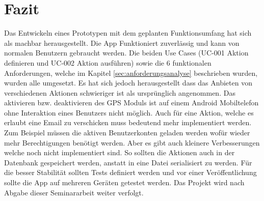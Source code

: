 \chapter{Fazit}
\label{sec:fazit}
Das Entwickeln eines Prototypen mit dem geplanten Funktionsumfang hat sich als machbar herausgestellt. Die App Funktioniert zuverlässig und kann von normalen Benutzern gebraucht werden. Die beiden Use Cases (UC-001 Aktion definieren und UC-002 Aktion ausführen) sowie die 6 funktionalen Anforderungen, welche im Kapitel \ref{sec:anforderungsanalyse} beschrieben wurden, wurden alle umgesetzt. \newline{} Es hat sich jedoch herausgestellt dass das Anbieten von verschiedenen Aktionen schwieriger ist als ursprünglich angenommen. Das aktivieren bzw. deaktivieren des GPS Moduls ist auf einem Android Mobiltelefon ohne Interaktion eines Benutzers nicht möglich. Auch für eine Aktion, welche es erlaubt eine Email zu verschicken muss bedeutend mehr implementiert werden. Zum Beispiel müssen die aktiven Benutzerkonten geladen werden wofür wieder mehr Berechtigungen benötigt werden. Aber es gibt auch kleinere Verbesserungen welche noch nicht implementiert sind. So sollten die Aktionen auch in der Datenbank gespeichert werden, anstatt in eine Datei serialisiert zu werden. Für die besser Stabilität sollten Tests definiert werden und vor einer Veröffentlichung sollte die App auf mehreren Geräten getestet werden. Das Projekt wird nach Abgabe dieser Seminararbeit weiter verfolgt.